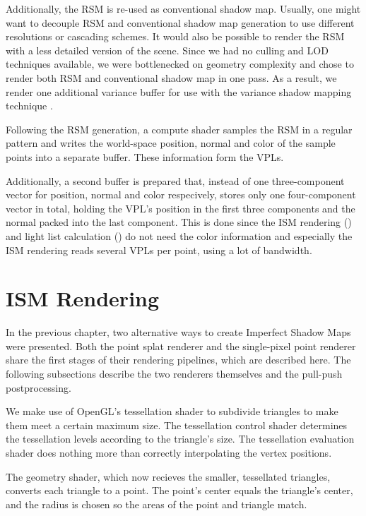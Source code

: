 Additionally, the RSM is re-used as conventional shadow map. Usually, one might want to decouple RSM and conventional shadow map generation to use different resolutions or cascading schemes. It would also be possible to render the RSM with a less detailed version of the scene. Since we had no culling and LOD techniques available, we were bottlenecked on geometry complexity and chose to render both RSM and conventional shadow map in one pass. As a result, we render one additional variance buffer for use with the variance shadow mapping technique \citep{Donnelly:2006:VSM}.

Following the RSM generation, a compute shader samples the RSM in a regular pattern and writes the world-space position, normal and color of the sample points into a separate buffer. These information form the VPLs.

Additionally, a second buffer is prepared that, instead of one three-component vector for position, normal and color respecively, stores only one four-component vector in total, holding the VPL's position in the first three components and the normal packed into the last component. This is done since the ISM rendering () and light list calculation () do not need the color information and especially the ISM rendering reads several VPLs per point, using a lot of bandwidth.


\section{ISM Rendering}
\label{sec:impl:ismRendering}

In the previous chapter, two alternative ways to create Imperfect Shadow Maps were presented. Both the point splat renderer and the single-pixel point renderer share the first stages of their rendering pipelines, which are described here. The following subsections describe the two renderers themselves and the pull-push postprocessing.

We make use of OpenGL's tessellation shader to subdivide triangles to make them meet a certain maximum size. The tessellation control shader determines the tessellation levels according to the triangle's size. The tessellation evaluation shader does nothing more than correctly interpolating the vertex positions.

The geometry shader, which now recieves the smaller, tessellated triangles, converts each triangle to a point. The point's center equals the triangle's center, and the radius is chosen so the areas of the point and triangle match.


